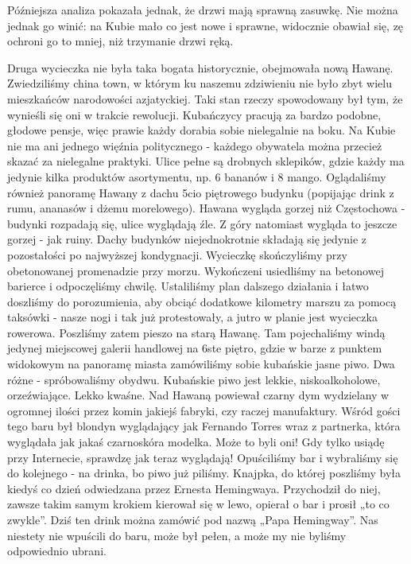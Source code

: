 Późniejsza analiza pokazała jednak, że drzwi mają sprawną zasuwkę.
Nie można jednak go winić: na Kubie mało co jest nowe i sprawne, widocznie obawiał się, zę ochroni go to mniej, niż trzymanie drzwi ręką.
\par Druga wycieczka nie była taka bogata historycznie, obejmowała nową Hawanę.
Zwiedziliśmy china town, w którym ku naszemu zdziwieniu nie było zbyt wielu mieszkańców narodowości azjatyckiej.
Taki stan rzeczy spowodowany był tym, że wynieśli się oni w trakcie rewolucji.
Kubańczycy pracują za bardzo podobne, głodowe pensje, więc prawie każdy dorabia sobie nielegalnie na boku.
Na Kubie nie ma ani jednego więźnia politycznego - każdego obywatela można przecież skazać za nielegalne praktyki.
Ulice pełne są drobnych sklepików, gdzie każdy ma jedynie kilka produktów asortymentu, np.
6 bananów i 8 mango.
Oglądaliśmy również panoramę Hawany z dachu 5cio piętrowego budynku (popijając drink z rumu, ananasów i dżemu morelowego).
Hawana wygląda gorzej niż Częstochowa - budynki rozpadają się, ulice wyglądają źle.
Z góry natomiast wygląda to jeszcze gorzej - jak ruiny.
Dachy budynków niejednokrotnie składają się jedynie z pozostałości po najwyższej kondygnacji.
Wycieczkę skończyliśmy przy obetonowanej promenadzie przy morzu.
Wykończeni usiedliśmy na betonowej barierce i odpoczęliśmy chwilę.
Ustaliliśmy plan dalszego działania i łatwo doszliśmy do porozumienia, aby obciąć dodatkowe kilometry marszu za pomocą taksówki - nasze nogi i tak już protestowały, a jutro w planie jest wycieczka rowerowa.
Poszliśmy zatem pieszo na starą Hawanę. Tam pojechaliśmy windą jedynej miejscowej galerii handlowej na 6ste piętro, gdzie w barze z punktem widokowym na panoramę miasta zamówiliśmy sobie kubańskie jasne piwo.
Dwa różne - spróbowaliśmy obydwu.
Kubańskie piwo jest lekkie, niskoalkoholowe, orzeźwiające.
Lekko kwaśne.
Nad Hawaną powiewał czarny dym wydzielany w ogromnej ilości przez komin jakiejś fabryki, czy raczej manufaktury.
Wśród gości tego baru był blondyn wyglądający jak Fernando Torres wraz z partnerka, która wyglądała jak jakaś czarnoskóra modelka.
Może to byli oni!
Gdy tylko usiądę przy Internecie, sprawdzę jak teraz wyglądają!
Opuściliśmy bar i wybraliśmy się do kolejnego - na drinka, bo piwo już piliśmy.
Knajpka, do której poszliśmy była kiedyś co dzień odwiedzana przez Ernesta Hemingwaya.
Przychodził do niej, zawsze takim samym krokiem kierował się w lewo, opierał o bar i prosił „to co zwykle”.
Dziś ten drink można zamówić pod nazwą „Papa Hemingway”.
Nas niestety nie wpuścili do baru, może był pełen, a może my nie byliśmy odpowiednio ubrani.
